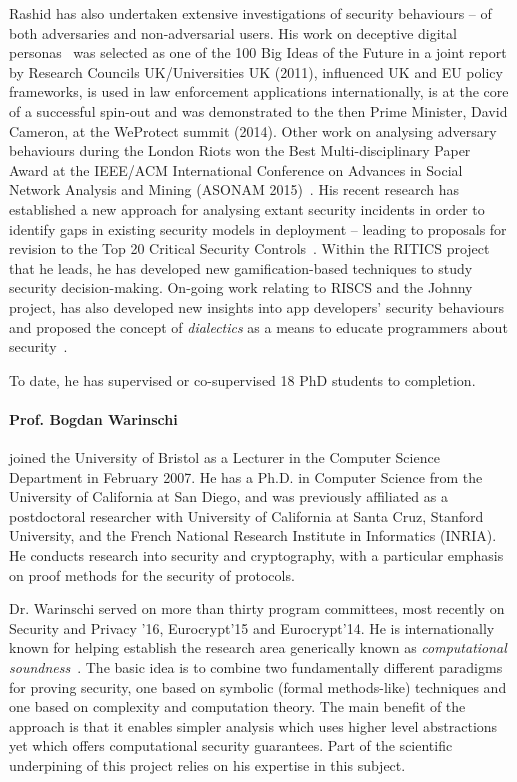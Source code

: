 \documentclass[10pt]{article}
\begin{document}
Rashid has also undertaken extensive investigations of security behaviours -- of both adversaries and non-adversarial users.
His work on deceptive digital personas~\cite{rashid2013} was selected as one of the 100 Big Ideas of the Future in a joint report by Research Councils UK/Universities UK (2011), influenced UK and EU policy frameworks, is used in law enforcement applications internationally, is at the core of a successful spin-out and was demonstrated to the then Prime Minister, David Cameron, at the WeProtect summit (2014). Other work on analysing adversary behaviours during the London Riots won the Best Multi-disciplinary Paper Award at the IEEE/ACM International Conference on Advances in Social Network Analysis and Mining (ASONAM 2015)~\cite{charitonidis2015}. His recent research has established a new approach for analysing extant security incidents in order to identify gaps in existing security models in deployment -- leading to proposals for revision to the Top 20 Critical Security Controls~\cite{rashid2016}. Within the RITICS project that he leads, he has developed new gamification-based techniques to study security decision-making. On-going work relating to RISCS and the Johnny project, has also developed new insights into app developers' security behaviours~\cite{weir2016} and proposed the concept of \textit{dialectics} as a means to educate programmers about security~\cite{weir2017}.  

To date, he has supervised or co-supervised 18 PhD students to completion.


\paragraph{Prof. Bogdan Warinschi} joined the University of 
Bristol as a Lecturer in the Computer Science Department in February 2007. 
He has a Ph.D. in Computer Science from the University of California
at San Diego, and was previously affiliated as a postdoctoral researcher with
University of California at Santa Cruz, Stanford University, and the
French National Research Institute in Informatics (INRIA).
He conducts research into security and cryptography, with a particular emphasis on
proof methods for the security of protocols.


Dr. Warinschi served on more than thirty program committees, most recently on Security and Privacy '16, Eurocrypt'15 and Eurocrypt'14.  He is internationally known for helping establish the research area generically known as {\em computational   soundness}~\cite{cortier05computationally,micciancio04soundness}.
The basic idea is to combine two fundamentally different paradigms for proving security, one based on symbolic (formal methods-like) techniques and one based on complexity and computation theory. The main benefit of the approach is that it enables simpler analysis which uses higher level abstractions yet which offers computational security guarantees. Part of the scientific underpining of this project relies on his expertise in this subject. 
\end{document}

